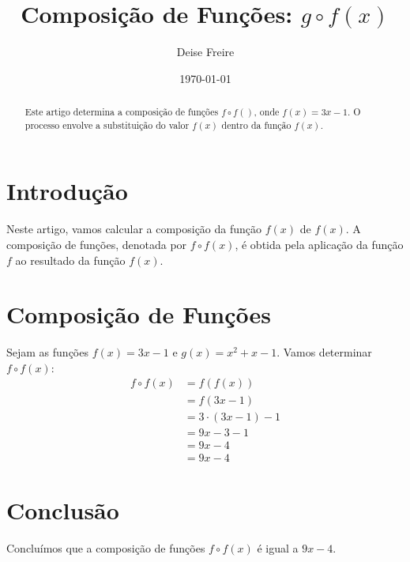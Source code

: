 \documentclass[12pt,a4paper]{article}
\begin{document}
\title{Composição de Funções: $g \circ f\left( x \right)$}
\author{Deise Freire}
\date{\today}
\maketitle
\begin{abstract}
    Este artigo determina a composição de funções $f \circ f\left( \right)$, onde $f\left( x \right) = 3x - 1$. O processo envolve a substituição do valor $f\left( x \right)$ dentro da função $f\left( x \right)$.
\end{abstract}
\section{Introdução}
    Neste artigo, vamos calcular a composição da função $f\left( x \right)$ de $f\left( x \right)$. A composição de funções, denotada por $f\circ f\left( x \right)$, é obtida pela aplicação da função $f$ ao resultado da função $f\left( x \right)$.
    \section{Composição de Funções}
    Sejam as funções $f\left( x \right) = 3x - 1$ e $g\left( x \right) = x^{2} + x - 1$. Vamos determinar $f \circ f\left( x \right)$:
    \begin{align*}
        f \circ f\left( x \right)
        &= f\left( f\left( x \right) \right) \\
        &= f\left( 3x - 1 \right) \\
        &= 3 \cdot \left( 3x - 1 \right) - 1 \\
        &= 9x - 3 - 1 \\
        &= 9x - 4 \\
        &= \boxed{9x - 4}
    \end{align*}
\section{Conclusão}
Concluímos que a composição de funções $f \circ f\left( x \right)$ é igual a $9x - 4$.
\end{document}
